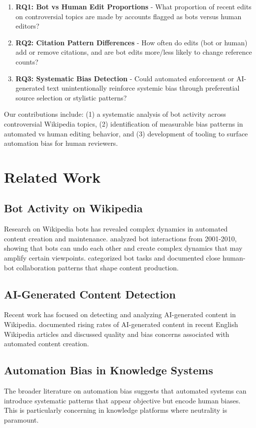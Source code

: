 \documentclass[11pt]{article}
\begin{document}
\begin{enumerate}
\item \textbf{RQ1: Bot vs Human Edit Proportions} - What proportion of recent edits on controversial topics are made by accounts flagged as bots versus human editors?
\item \textbf{RQ2: Citation Pattern Differences} - How often do edits (bot or human) add or remove citations, and are bot edits more/less likely to change reference counts?
\item \textbf{RQ3: Systematic Bias Detection} - Could automated enforcement or AI-generated text unintentionally reinforce systemic bias through preferential source selection or stylistic patterns?
\end{enumerate}

Our contributions include: (1) a systematic analysis of bot activity across controversial Wikipedia topics, (2) identification of measurable bias patterns in automated vs human editing behavior, and (3) development of tooling to surface automation bias for human reviewers.

\section{Related Work}

\subsection{Bot Activity on Wikipedia}
Research on Wikipedia bots has revealed complex dynamics in automated content creation and maintenance. \citet{tsvetkova2017even} analyzed bot interactions from 2001-2010, showing that bots can undo each other and create complex dynamics that may amplify certain viewpoints. \citet{zheng2019roles} categorized bot tasks and documented close human-bot collaboration patterns that shape content production.

\subsection{AI-Generated Content Detection}
Recent work has focused on detecting and analyzing AI-generated content in Wikipedia. \citet{brooks2024rise} documented rising rates of AI-generated content in recent English Wikipedia articles and discussed quality and bias concerns associated with automated content creation.

\subsection{Automation Bias in Knowledge Systems}
The broader literature on automation bias suggests that automated systems can introduce systematic patterns that appear objective but encode human biases. This is particularly concerning in knowledge platforms where neutrality is paramount.
\end{document}
